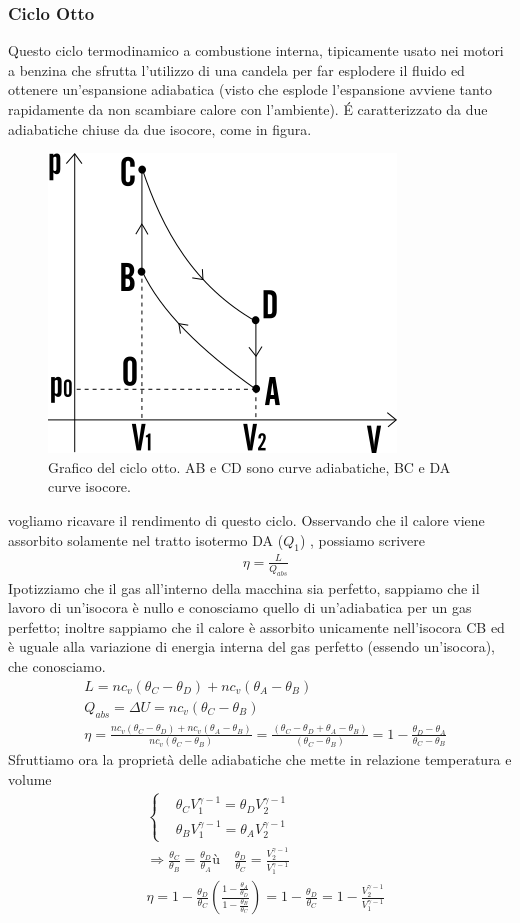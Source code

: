 \documentclass[
10pt, %
a4paper, %
oneside, %
headinclude,footinclude, %
BCOR5mm, %
]{scrartcl}
\begin{document}
\subsubsection{Ciclo Otto}
Questo ciclo termodinamico a combustione interna, tipicamente usato nei motori a benzina che sfrutta l'utilizzo di una candela per far esplodere il fluido ed ottenere un'espansione adiabatica (visto che esplode l'espansione avviene tanto rapidamente da non scambiare calore con l'ambiente). \'{E} caratterizzato da due adiabatiche chiuse da due isocore, come in figura.
\begin{figure}[h!]
	\centering
	\includegraphics[width=0.4\linewidth]{../images/ciclo-otto}
	\caption{Grafico del ciclo otto. AB e CD sono curve adiabatiche, BC e DA curve isocore.}
	\label{fig:ciclo-otto}
\end{figure}
\FloatBarrier
vogliamo ricavare il rendimento di questo ciclo. Osservando che il calore viene assorbito solamente nel tratto isotermo DA ($Q_1$) , possiamo scrivere
\begin{align*}
	&\eta = \frac{L}{Q_{abs}}
\end{align*} 
Ipotizziamo che il gas all'interno della macchina sia perfetto, sappiamo che il lavoro di un'isocora è nullo e conosciamo quello di un'adiabatica per un gas perfetto; inoltre sappiamo che il calore è assorbito unicamente nell'isocora CB ed è uguale alla variazione di energia interna del gas perfetto (essendo un'isocora), che conosciamo.
\begin{align*}
	&L =n c_v (\theta_C-\theta_D) + n c_v(\theta_A-\theta_B)\\
	&Q_{abs} = \Delta U = n c_v (\theta_C-\theta_B)\\
	&\eta = \frac{n c_v (\theta_C-\theta_D) + n c_v(\theta_A-\theta_B)}{n c_v (\theta_C-\theta_B)} = \frac{(\theta_C-\theta_D + \theta_A-\theta_B)}{(\theta_C-\theta_B)} = 1 - \frac{\theta_D - \theta_A}{\theta_C - \theta_B}
\end{align*}
Sfruttiamo ora la proprietà delle adiabatiche che mette in relazione temperatura e volume
\begin{align*}
	&\begin{cases}
		&\theta_C V_1^{\gamma-1} = \theta_D V_2^{\gamma-1}\\
		&\theta_B V_1^{\gamma-1} = \theta_A V_2^{\gamma-1}
	\end{cases}\\
	& \Rightarrow \frac{\theta_C}{\theta_B} = \frac{\theta_D}{\theta_A}ù \quad \frac{\theta_D}{\theta_C}=\frac{V_2^{\gamma-1}}{V_1^{\gamma-1}}\\
	&\eta = 1 - \frac{\theta_D}{\theta_C}\left(\frac{1-\frac{\theta_A}{\theta_D}}{1-\frac{\theta_B}{\theta_C}}\right) = 1-\frac{\theta_D}{\theta_C} = 1-\frac{V_2^{\gamma-1}}{V_1^{\gamma-1}}
\end{align*}
\end{document}
